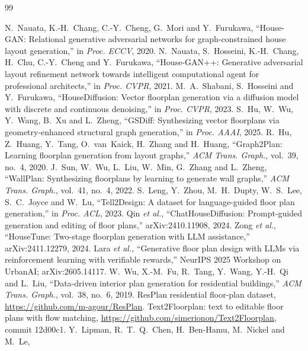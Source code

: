 \documentclass[11pt,a4paper]{article}
\begin{document}
\begin{thebibliography}{99}
\small
{} N.~Nauata, K.-H.~Chang, C.-Y.~Cheng, G.~Mori and Y.~Furukawa,
  ``House-GAN: Relational generative adversarial networks for graph-constrained house layout generation,'' in \emph{Proc. ECCV}, 2020.
 N.~Nauata, S.~Hosseini, K.-H.~Chang, H.~Chu, C.-Y.~Cheng and Y.~Furukawa,
  ``House-GAN++: Generative adversarial layout refinement network towards intelligent computational agent for professional architects,'' in \emph{Proc. CVPR}, 2021.
 M.~A.~Shabani, S.~Hosseini and Y.~Furukawa,
  ``HouseDiffusion: Vector floorplan generation via a diffusion model with discrete and continuous denoising,'' in \emph{Proc. CVPR}, 2023.
 S.~Hu, W.~Wu, Y.~Wang, B.~Xu and L.~Zheng,
  ``GSDiff: Synthesizing vector floorplans via geometry-enhanced structural graph generation,'' in \emph{Proc. AAAI}, 2025.
 R.~Hu, Z.~Huang, Y.~Tang, O.~van~Kaick, H.~Zhang and H.~Huang,
  ``Graph2Plan: Learning floorplan generation from layout graphs,'' \emph{ACM Trans. Graph.}, vol.~39, no.~4, 2020.
 J.~Sun, W.~Wu, L.~Liu, W.~Min, G.~Zhang and L.~Zheng,
  ``WallPlan: Synthesizing floorplans by learning to generate wall graphs,'' \emph{ACM Trans. Graph.}, vol.~41, no.~4, 2022.
 S.~Leng, Y.~Zhou, M.~H.~Dupty, W.~S.~Lee, S.~C.~Joyce and W.~Lu,
  ``Tell2Design: A dataset for language-guided floor plan generation,'' in \emph{Proc. ACL}, 2023.
 Qin \emph{et al.},
  ``ChatHouseDiffusion: Prompt-guided generation and editing of floor plans,'' arXiv:2410.11908, 2024.
 Zong \emph{et al.},
  ``HouseTune: Two-stage floorplan generation with LLM assistance,'' arXiv:2411.12279, 2024.
 Lara \emph{et al.},
  ``Generative floor plan design with LLMs via reinforcement learning with verifiable rewards,'' NeurIPS 2025 Workshop on UrbanAI; arXiv:2605.14117.
 W.~Wu, X.-M.~Fu, R.~Tang, Y.~Wang, Y.-H.~Qi and L.~Liu,
  ``Data-driven interior plan generation for residential buildings,'' \emph{ACM Trans. Graph.}, vol.~38, no.~6, 2019.
 ResPlan residential floor-plan dataset, \url{https://github.com/m-agour/ResPlan}.
 Text2Floorplan: text to editable floor plans with flow matching, \url{https://github.com/simerionon/Text2Floorplan}, commit 12d00c1.
 Y.~Lipman, R.~T.~Q.~Chen, H.~Ben-Hamu, M.~Nickel and M.~Le,

\end{thebibliography}
\end{document}
